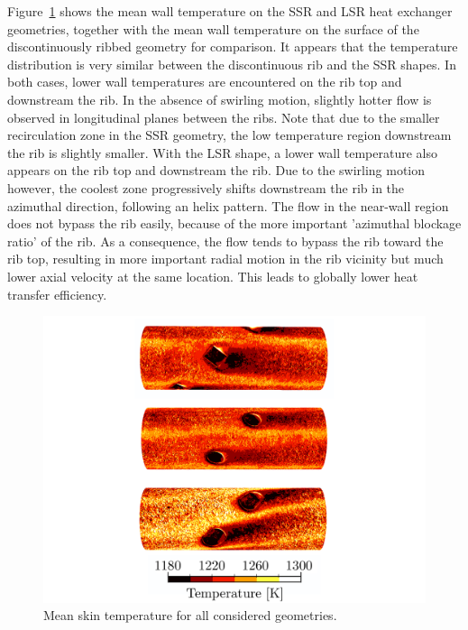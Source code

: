 Figure~\ref{Twall_compare} shows the mean wall temperature on the SSR and LSR heat exchanger geometries, together with the mean wall temperature on the surface of the discontinuously ribbed geometry for comparison. It appears that the temperature distribution is very similar between the discontinuous rib and the SSR shapes. In both cases, lower wall temperatures are encountered on the rib top and downstream the rib. In the absence of swirling motion, slightly hotter flow is observed in longitudinal planes between the ribs. Note that due to the smaller recirculation zone in the SSR geometry, the low temperature region downstream the rib is slightly smaller. With the LSR shape, a lower wall temperature also appears on the rib top and downstream the rib. Due to the swirling motion however, the coolest zone progressively shifts downstream the rib in the azimuthal direction, following an helix pattern. The flow in the near-wall region does not bypass the rib easily, because of the more important 'azimuthal blockage ratio' of the rib. As a consequence, the flow tends to bypass the rib toward the rib top, resulting in more important radial motion in the rib vicinity but much lower axial velocity at the same location. This leads to globally lower heat transfer efficiency.\\

\begin{figure}[h]
\centering
\includegraphics[width=0.7\linewidth]{fig/applications/optim/Twall_compare.pdf}
\caption{Mean skin temperature for all considered geometries.}
\label{Twall_compare}
\end{figure}

